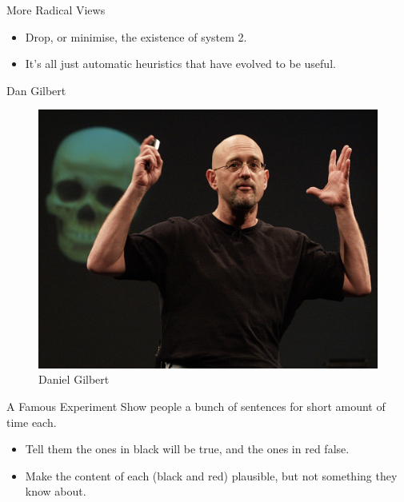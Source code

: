 \documentclass[
  17pt,
  letterpaper,
  ignorenonframetext,
  aspectratio=169,
  handout]{beamer}
\providecommand{\tightlist}{%
  \setlength{\itemsep}{0pt}\setlength{\parskip}{0pt}}\usepackage{longtable,booktabs,array}
\begin{document}
\begin{frame}{More Radical Views}
\protect\hypertarget{more-radical-views}{}
\begin{itemize}[<+->]
\tightlist
\item
  Drop, or minimise, the existence of system 2.
\item
  It's all just automatic heuristics that have evolved to be useful.
\end{itemize}
\end{frame}

\begin{frame}{Dan Gilbert}
\protect\hypertarget{dan-gilbert}{}
\begin{figure}

{\centering \includegraphics[width=\textwidth,height=0.6\textheight]{../images/gilbert.png}

}

\caption{Daniel Gilbert}

\end{figure}
\end{frame}

\begin{frame}{A Famous Experiment}
\protect\hypertarget{a-famous-experiment}{}
Show people a bunch of sentences for short amount of time each.

\begin{itemize}[<+->]
\tightlist
\item
  Tell them the ones in black will be true, and the ones in red false.
\item
  Make the content of each (black and red) plausible, but not something
  they know about.
\end{itemize}
\end{frame}
\end{document}
